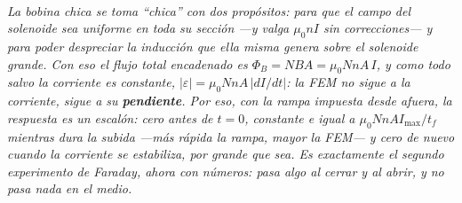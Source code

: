 \begin{center}
\\[0.5em]
{\small\itshape La bobina chica se toma ``chica'' con dos propósitos: para que
el campo del solenoide sea uniforme en toda su sección ---y valga $\mu_0 n I$
sin correcciones--- y para poder despreciar la inducción que ella misma genera
sobre el solenoide grande. Con eso el flujo total encadenado es
$\Phi_B = N B A = \mu_0 N n A\,I$, y como todo salvo la corriente es constante,
$|\varepsilon| = \mu_0 N n A\,|dI/dt|$: la FEM no sigue a la corriente, sigue a
su \textbf{pendiente}. Por eso, con la rampa impuesta desde afuera, la respuesta
es un escalón: cero antes de $t=0$, constante e igual a
$\mu_0 N n A I_{\max}/t_f$ mientras dura la subida ---más rápida la rampa, mayor
la FEM--- y cero de nuevo cuando la corriente se estabiliza, por grande que sea.
Es exactamente el segundo experimento de Faraday, ahora con números: pasa algo
al cerrar y al abrir, y no pasa nada en el medio.}
\end{center}
